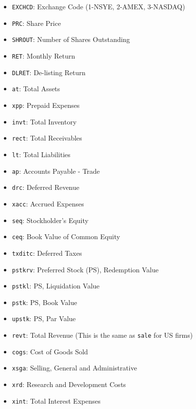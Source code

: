 \begin{itemize}
  \item \texttt{EXCHCD}: Exchange Code (1-NSYE, 2-AMEX, 3-NASDAQ)
  \item \texttt{PRC}: Share Price
  \item \texttt{SHROUT}: Number of Shares Outstanding
  \item \texttt{RET}: Monthly Return
  \item \texttt{DLRET}: De-listing Return
  \item \texttt{at}: Total Assets
  \item \texttt{xpp}: Prepaid Expenses
  \item \texttt{invt}: Total Inventory
  \item \texttt{rect}: Total Receivables
  \item \texttt{lt}: Total Liabilities
  \item \texttt{ap}: Accounts Payable - Trade
  \item \texttt{drc}: Deferred Revenue
  \item \texttt{xacc}: Accrued Expenses
  \item \texttt{seq}: Stockholder's Equity
  \item \texttt{ceq}: Book Value of Common Equity
  \item \texttt{txditc}: Deferred Taxes
  \item \texttt{pstkrv}: Preferred Stock (PS), Redemption Value
  \item \texttt{pstkl}: PS, Liquidation Value
  \item \texttt{pstk}: PS, Book Value
  \item \texttt{upstk}: PS, Par Value
  \item \texttt{revt}: Total Revenue (This is the same as \texttt{sale} for US firms)
  \item \texttt{cogs}: Cost of Goods Sold
  \item \texttt{xsga}: Selling, General and Administrative
  \item \texttt{xrd}: Research and Development Costs
  \item \texttt{xint}: Total Interest Expenses
\end{itemize}

